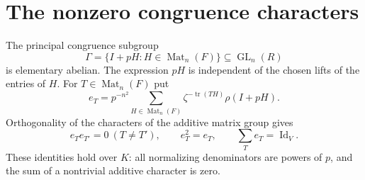 \documentclass[11pt]{article}
\theoremstyle{remark}\newtheorem{remark}[theorem]{Remark}
\newcommand{\Mat}{\operatorname{Mat}}
\newcommand{\GL}{\operatorname{GL}}
\newcommand{\tr}{\operatorname{tr}}
\newcommand{\Id}{\operatorname{Id}}
\begin{document}
\section{The nonzero congruence characters}

The principal congruence subgroup
\[
 \Gamma=\{I+pH:H\in\Mat_n(F)\}\subseteq\GL_n(R)
\]
is elementary abelian. The expression $pH$ is independent of the chosen lifts of the entries of $H$. For $T\in\Mat_n(F)$ put
\begin{equation}\label{eq:projector}
 e_T=p^{-n^2}\sum_{H\in\Mat_n(F)}
       \zeta^{-\tr(TH)}\rho(I+pH).
\end{equation}
Orthogonality of the characters of the additive matrix group gives
\begin{equation}\label{eq:orthogonal}
 e_Te_{T'}=0\ (T\ne T'),\qquad e_T^2=e_T,
 \qquad\sum_Te_T=\Id_V.
\end{equation}
These identities hold over $K$: all normalizing denominators are powers of $p$, and the sum of a nontrivial additive character is zero.
\end{document}
